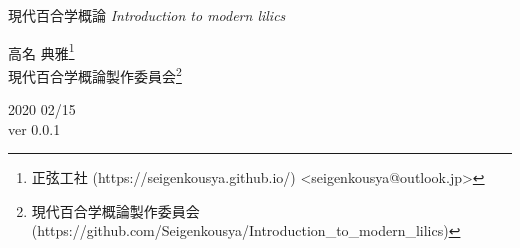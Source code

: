\documentclass[ %
	uplatex,%
	a5paper,%
	papersize%
	]{jsbook}
\begin{document}

						\begin{titlepage}
							\pagecolor{black}
							\color{white}
							\renewcommand{\thefootnote}{\textcolor{red}{\fnsymbol{footnote}}}
							
							\begin{center}
								\vspace*{20mm}
								\fontsize{36pt}{0pt} \selectfont
								現代百合学概論
								\vspace*{5mm}
								\fontsize{21pt}{3pt} \selectfont
								{\sl Introduction to modern lilics}
								\vspace{30mm}

								{\LARGE 高名 典雅\footnote[2]{\color{white}正弦工社 (https://seigenkousya.github.io/) <seigenkousya@outlook.jp>}}
								\vspace{2mm}\\
								\color{white}
								{\LARGE 現代百合学概論製作委員会\footnote[3]{\color{white}現代百合学概論製作委員会(https://github.com/Seigenkousya/Introduction\_to\_modern\_lilics)}}
								\vspace{10mm}\\
		
								\begin{flushright}
									\color{white}
									{\rm \Large 2020 02/15}\vspace{2mm}\\
									{\rm \Large ver 0.0.1}
								\end{flushright}

								\vspace{10mm}
							\end{center}
						\end{titlepage}
\end{document}
